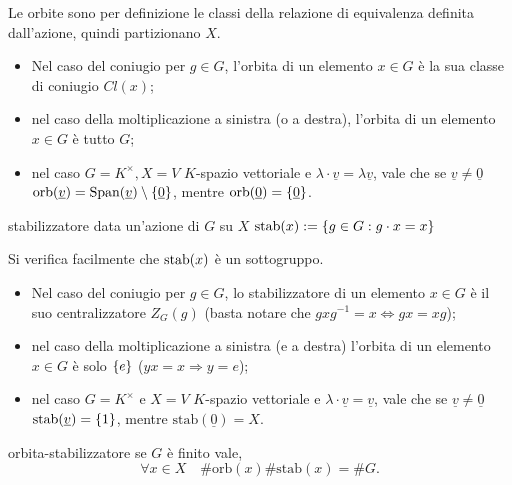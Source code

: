 Le orbite sono per definizione le classi della relazione di equivalenza definita dall'azione, quindi partizionano $X$.
\begin{itemize}
    \item Nel caso del coniugio per $g \in G$, l'orbita di un elemento $x \in G$ è la sua classe di coniugio $Cl(x)$;
    \item nel caso della moltiplicazione a sinistra (o a destra), l'orbita di un elemento $x \in G$ è tutto $G$;
    \item nel caso $G = K^\times, X = V$ $K$-spazio vettoriale e $\lambda \cdot \underline{v} = \lambda\underline{v}$, vale che se $\underline{v} \neq \underline{0}$ $\text{orb}(\underline{v}) = \text{Span}(\underline{v}) \setminus \left\{ \underline{0} \right\}$, mentre $\text{orb}(\underline{0}) = \left\{ \underline{0} \right\}$.
    \end{itemize}
\begin{definition}{stabilizzatore}
    data un'azione di $G$ su $X$ $\text{stab}(x) := \left\{ g \in G : g \cdot x = x \right\} $
\end{definition} 
Si verifica facilmente che $\text{stab}(x)$ è un sottogruppo.
\begin{itemize}
    \item Nel caso del coniugio per $g \in G$, lo stabilizzatore di un elemento $x \in G$ è il suo centralizzatore $Z_G(g)$ (basta notare che $gxg^{-1} = x \Longleftrightarrow gx = xg$);
    \item nel caso della moltiplicazione a sinistra (e a destra) l'orbita di un elemento $x \in G$ è solo $\left\{ e \right\}$ ($yx = x \Rightarrow y = e$);
    \item nel caso $G = K^\times$ e $X = V$ $K$-spazio vettoriale e $\lambda \cdot \underline{v} = \underline{v}$, vale che se $\underline{v} \neq \underline{0}$ $\text{stab}(\underline{v}) = \left\{ 1 \right\}$, mentre $\text{stab}(\underline{0}) = X$.
    \end{itemize}
\begin{lemma}{orbita-stabilizzatore}
    se $G$ è finito vale,
    \[
    \forall x \in X \quad \#\text{orb}(x) \#\text{stab}(x) = \#G.
    \]
\end{lemma}
